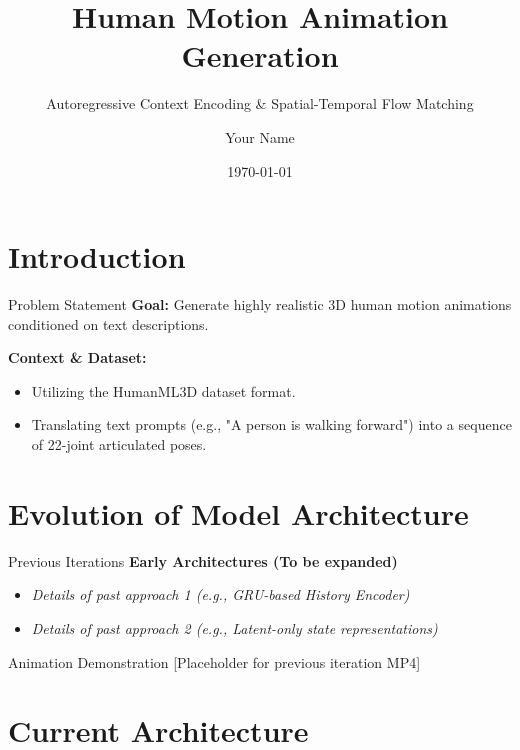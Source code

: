 \documentclass[aspectratio=169]{beamer}
\title{Human Motion Animation Generation}
\subtitle{Autoregressive Context Encoding \& Spatial-Temporal Flow Matching}
\author{Your Name}
\institute{CSE 330 Machine Learning Project, BUET}
\date{\today}
\begin{document}
\maketitle

\section{Introduction}

\begin{frame}{Problem Statement}
    \textbf{Goal:} Generate highly realistic 3D human motion animations conditioned on text descriptions.
    \vspace{0.5cm}
    
    \textbf{Context \& Dataset:} 
    \begin{itemize}
        \item Utilizing the HumanML3D dataset format.
        \item Translating text prompts (e.g., "A person is walking forward") into a sequence of 22-joint articulated poses.
    \end{itemize}
\end{frame}

\section{Evolution of Model Architecture}

\begin{frame}{Previous Iterations}
    \textbf{Early Architectures (To be expanded)}
    \begin{itemize}
        \item \textit{Details of past approach 1 (e.g., GRU-based History Encoder)}
        \item \textit{Details of past approach 2 (e.g., Latent-only state representations)}
    \end{itemize}
    
    \vspace{0.5cm}
    \begin{block}{Animation Demonstration}
        [Placeholder for previous iteration MP4]
    \end{block}
\end{frame}

\section{Current Architecture}
\end{document}
